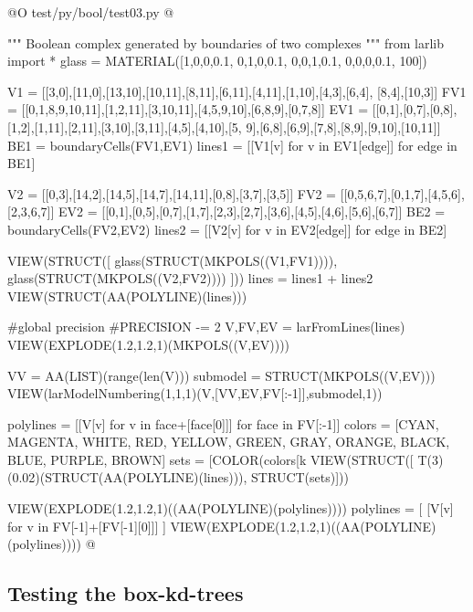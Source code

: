 \documentclass[11pt,oneside]{article}    %
\begin{document}
@O test/py/bool/test03.py
@{""" Boolean complex generated by boundaries of two complexes """
from larlib import *
glass = MATERIAL([1,0,0,0.1,  0,1,0,0.1,  0,0,1,0.1, 0,0,0,0.1, 100])

V1 = [[3,0],[11,0],[13,10],[10,11],[8,11],[6,11],[4,11],[1,10],[4,3],[6,4],
        [8,4],[10,3]]
FV1 = [[0,1,8,9,10,11],[1,2,11],[3,10,11],[4,5,9,10],[6,8,9],[0,7,8]]
EV1 = [[0,1],[0,7],[0,8],[1,2],[1,11],[2,11],[3,10],[3,11],[4,5],[4,10],[5,
        9],[6,8],[6,9],[7,8],[8,9],[9,10],[10,11]]
BE1 = boundaryCells(FV1,EV1)
lines1 = [[V1[v] for v in EV1[edge]] for edge in BE1]

V2 = [[0,3],[14,2],[14,5],[14,7],[14,11],[0,8],[3,7],[3,5]]
FV2 = [[0,5,6,7],[0,1,7],[4,5,6],[2,3,6,7]]
EV2 = [[0,1],[0,5],[0,7],[1,7],[2,3],[2,7],[3,6],[4,5],[4,6],[5,6],[6,7]]
BE2 = boundaryCells(FV2,EV2)
lines2 = [[V2[v] for v in EV2[edge]] for edge in BE2]

VIEW(STRUCT([ glass(STRUCT(MKPOLS((V1,FV1)))), glass(STRUCT(MKPOLS((V2,FV2)))) ]))
lines = lines1 + lines2
VIEW(STRUCT(AA(POLYLINE)(lines)))

#global precision
#PRECISION -= 2
V,FV,EV = larFromLines(lines)
VIEW(EXPLODE(1.2,1.2,1)(MKPOLS((V,EV))))

VV = AA(LIST)(range(len(V)))
submodel = STRUCT(MKPOLS((V,EV)))
VIEW(larModelNumbering(1,1,1)(V,[VV,EV,FV[:-1]],submodel,1))

polylines = [[V[v] for v in face+[face[0]]] for face in FV[:-1]]
colors = [CYAN, MAGENTA, WHITE, RED, YELLOW, GREEN, GRAY, ORANGE, BLACK, BLUE, PURPLE, BROWN]
sets = [COLOR(colors[k%
VIEW(STRUCT([ T(3)(0.02)(STRUCT(AA(POLYLINE)(lines))), STRUCT(sets)]))

VIEW(EXPLODE(1.2,1.2,1)((AA(POLYLINE)(polylines))))
polylines = [ [V[v] for v in FV[-1]+[FV[-1][0]]] ]
VIEW(EXPLODE(1.2,1.2,1)((AA(POLYLINE)(polylines))))
@}



\subsection{Testing the box-kd-trees}
\end{document}
